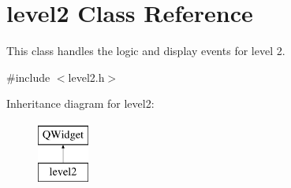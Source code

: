 \hypertarget{classlevel2}{}\section{level2 Class Reference}
\label{classlevel2}


This class handles the logic and display events for level 2.  




{\ttfamily \#include $<$level2.\+h$>$}

Inheritance diagram for level2\+:\begin{figure}[H]
\begin{center}
\leavevmode
\includegraphics[height=2.000000cm]{classlevel2}
\end{center}
\end{figure}
